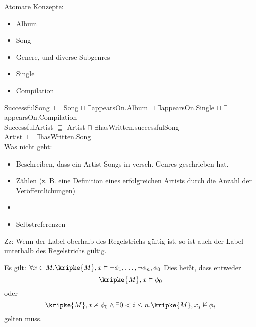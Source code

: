 
Atomare Konzepte:
\begin{itemize}
	\item Album
	\item Song
	\item Genere, und diverse Subgenres
	\item Single
	\item Compilation
\end{itemize}

SuccessfulSong $\sqsubseteq$ Song 	$\sqcap$ $\exists$\hspace{1pt}appearsOn.Album
									$\sqcap$ $\exists$\hspace{1pt}appearsOn.Single
									$\sqcap$
									$\exists$\hspace{1pt}appearsOn.Compilation\\

SuccessfulArtist $\sqsubseteq$ Artist $\sqcap$
$\exists$\hspace{1pt}hasWritten.successfulSong\\

Artist $\sqsubseteq$ $\exists$\hspace{1pt}hasWritten.Song\\

Was nicht geht:
\begin{itemize}
	\item Beschreiben, dass ein Artist Songs in versch. Genres geschrieben hat.
	\item Zählen (z. B. eine Definition eines erfolgreichen Artists durch die
		Anzahl der Veröffentlichungen)
	\item {}
	\item Selbstreferenzen
\end{itemize}


Zz: Wenn der Label oberhalb des Regelstrichs gültig ist, so ist auch der Label
unterhalb des Regelstrichs gültig.



Es gilt: $\forall x \in M.\kripke{M},x\vDash \neg \phi_1,\dots,\neg \phi_n,\phi_0$
Dies heißt, dass entweder \[\kripke{M},x \vDash \phi_0\] oder \[\kripke{M},x
\nvDash \phi_0 \wedge \exists 0 < i \leq n.\kripke{M},x_j \nvDash \phi_i\] gelten muss.

